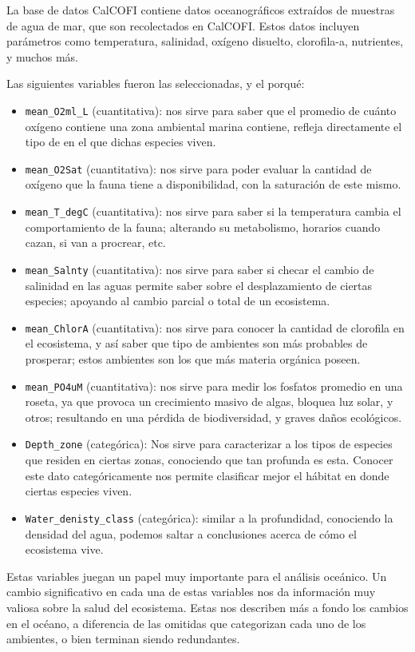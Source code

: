 \tab La base de datos CalCOFI contiene datos oceanográficos extraídos de muestras de agua de mar, que son recolectados en CalCOFI. Estos datos incluyen parámetros como temperatura, salinidad, oxígeno disuelto, clorofila-a, nutrientes, y muchos más. 

Las siguientes variables fueron las seleccionadas, y el porqué:
\begin{itemize}
    \item \texttt{mean\_O2ml\_L} (cuantitativa): nos sirve para saber que el promedio de cuánto oxígeno contiene una zona ambiental marina contiene, refleja directamente el tipo de en el que dichas especies viven.
    \item \texttt{mean\_O2Sat} (cuantitativa): nos sirve para poder evaluar la cantidad de oxígeno que la fauna tiene a disponibilidad, con la saturación de este mismo.
    \item \texttt{mean\_T\_degC} (cuantitativa): nos sirve para saber si la temperatura cambia el comportamiento de la fauna; alterando su metabolismo, horarios cuando cazan, si van a procrear, etc.
    \item \texttt{mean\_Salnty} (cuantitativa): nos sirve para saber si checar el cambio de salinidad en las aguas permite saber sobre el desplazamiento de ciertas especies; apoyando al cambio parcial o total de un ecosistema.
    \item \texttt{mean\_ChlorA} (cuantitativa): nos sirve para conocer la cantidad de clorofila en el ecosistema, y así saber que tipo de ambientes son más probables de prosperar; estos ambientes son los que más materia orgánica poseen.
    \item \texttt{mean\_PO4uM} (cuantitativa): nos sirve para medir los fosfatos promedio en una roseta, ya que provoca un crecimiento masivo de algas, bloquea luz solar, y otros; resultando en una pérdida de biodiversidad, y graves daños ecológicos.
    \item \texttt{Depth\_zone} (categórica): Nos sirve para caracterizar a los tipos de especies que residen en ciertas zonas, conociendo que tan profunda es esta. Conocer este dato categóricamente nos permite clasificar mejor el hábitat en donde ciertas especies viven.
    \item \texttt{Water\_denisty\_class} (categórica): similar a la profundidad, conociendo la densidad del agua, podemos saltar a conclusiones acerca de cómo el ecosistema vive.
\end{itemize}

\tab Estas variables juegan un papel muy importante para el análisis oceánico. Un cambio significativo en cada una de estas variables nos da información muy valiosa sobre la salud del ecosistema. Estas nos describen más a fondo los cambios en el océano, a diferencia de las omitidas que categorizan cada uno de los ambientes, o bien terminan siendo redundantes. 
